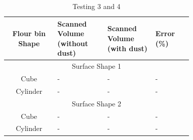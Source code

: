 \begin{table}[H]
	\caption{Testing 3 and 4}
	\label{ch4:tab:Testing 3 and 4}
	\centering
	\begin{tabular}{|c|p{0.27\linewidth}|p{0.26\linewidth}|p{0.2\linewidth}|}
		\hline
		Flour bin Shape & Scanned Volume (without dust) & Scanned Volume (with dust) & Error (\%) \\
		\hline
		\multicolumn{4}{|c|}{Surface Shape 1}                                                     \\
		\hline
		Cube            & -                             & -                          & -          \\
		\hline
		Cylinder        & -                             & -                          & -          \\
		\hline
		\multicolumn{4}{|c|}{Surface Shape 2}                                                     \\
		\hline
		Cube            & -                             & -                          & -          \\
		\hline
		Cylinder        & -                             & -                          & -          \\
		\hline
	\end{tabular}
\end{table}